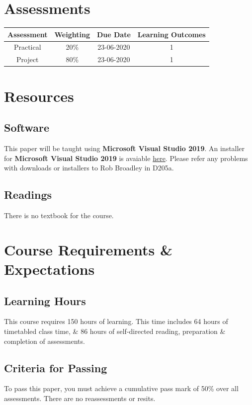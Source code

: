 \documentclass{article}
\begin{document}
\section*{Assessments}
\renewcommand{\arraystretch}{1.5}
\begin{tabular}{|c|c|c|c|}
	\hline
	\textbf{Assessment}                                & \textbf{Weighting} & \textbf{Due Date} & \textbf{Learning Outcomes} \\ \hline 
	\small Practical                       & \small 20\%        & \small 23-06-2020 & \small 1                   \\ \hline
	\small Project                       & \small 80\%        & \small 23-06-2020 & \small 1                   \\ \hline
\end{tabular}

\section*{Resources}

\subsection*{Software}
This paper will be taught using \textbf{Microsoft Visual Studio 2019}. An installer for \textbf{Microsoft Visual Studio 2019} is avaiable \href{https://visualstudio.microsoft.com/downloads/}{here}. Please refer any problems with downloads or installers to Rob Broadley in D205a.

\subsection*{Readings}
There is no textbook for the course.

\section*{Course Requirements \& Expectations}

\subsection*{Learning Hours}
This course requires 150 hours of learning. This time includes 64 hours of timetabled class time, \& 86 hours of self-directed reading, preparation \& completion of assessments.

\subsection*{Criteria for Passing}
To pass this paper, you must achieve a cumulative pass mark of 50\% over all assessments. There are no reassessments or resits.
\end{document}
